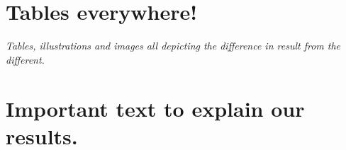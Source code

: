 \documentclass[../../main.tex]{subfiles}
\begin{document}
\section{Tables everywhere!}
\textit{Tables, illustrations and images all depicting the difference in result from the different. }


\section{Important text to explain our results.}
\textit{}
\end{document}
